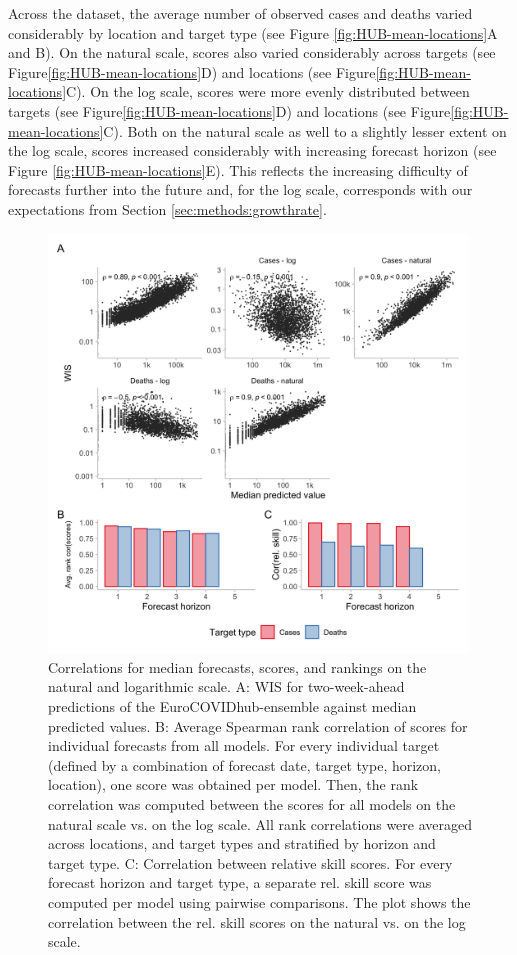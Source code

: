 \documentclass{article}
\begin{document}
Across the dataset, the average number of observed cases and deaths varied considerably by location and target type (see Figure \ref{fig:HUB-mean-locations}A and B). On the natural scale, scores also varied considerably across targets (see Figure\ref{fig:HUB-mean-locations}D) and locations (see Figure\ref{fig:HUB-mean-locations}C). On the log scale, scores were more evenly distributed between targets (see Figure\ref{fig:HUB-mean-locations}D) and locations (see Figure\ref{fig:HUB-mean-locations}C). Both on the natural scale as well to a slightly lesser extent on the log scale, scores increased considerably with increasing forecast horizon (see Figure \ref{fig:HUB-mean-locations}E). This reflects the increasing difficulty of forecasts further into the future and, for the log scale, corresponds with our expectations from Section \ref{sec:methods:growthrate}. 

\begin{figure}[h!]
    \centering
    \includegraphics[width=0.99\textwidth]{output/figures/HUB-correlations.png}
    \caption{Correlations for median forecasts, scores, and rankings on the natural and logarithmic scale. A: WIS for two-week-ahead predictions of the EuroCOVIDhub-ensemble against median predicted values. B: Average Spearman rank correlation of scores for individual forecasts from all models. For every individual target (defined by a combination of forecast date, target type, horizon, location), one score was obtained per model. Then, the rank correlation was computed between the scores for all models on the natural scale vs. on the log scale. All rank correlations were averaged across locations, and target types and stratified by horizon and target type. C: Correlation between relative skill scores. For every forecast horizon and target type, a separate rel. skill score was computed per model using pairwise comparisons. The plot shows the correlation between the rel. skill scores on the natural vs. on the log scale.}
    \label{fig:HUB-cors}
\end{figure}
\end{document}
